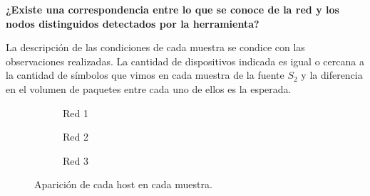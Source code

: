 \vspace{4mm}

\textbf{¿Existe una correspondencia entre lo que se conoce de la red y los nodos distinguidos detectados por la herramienta?}

La descripción de las condiciones de cada muestra se condice con las observaciones realizadas. La cantidad de dispositivos indicada es igual o cercana a la cantidad de símbolos que vimos en cada muestra de la fuente $S_{2}$ y la diferencia en el volumen de paquetes entre cada uno de ellos es la esperada.

\begin{figure}[H]
    \centering
    \begin{subfigure}[b]{0.49\textwidth} 
        
        \centering
        \caption{Red 1}
    \end{subfigure}
    \begin{subfigure}[b]{0.49\textwidth} 
        
        \centering
        \caption{Red 2}
    \end{subfigure}
    \begin{subfigure}[b]{0.49\textwidth}  
        \centering
        
        \caption{Red 3}
    \end{subfigure}
    \caption{Aparición de cada host en cada muestra.}
    \label{fig: porcentaje de aparcion s2}
\end{figure}









